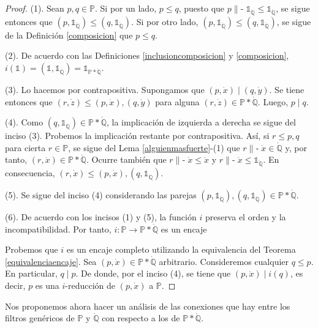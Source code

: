 \documentclass[11pt]{unam_tesis1}
\theoremstyle{MyThmStyle}
\theoremstyle{definition}
\theoremstyle{plain}
\theoremstyle{remark}
\def\forces{\mathop{\parallel\!\!\!-}\nolimits}
\let\Vdash\forces
\let\leq\leqslant
\begin{document}
\begin{proof}
(1). Sean $p,q\in \mathbb P$. Si por un lado, $p\leq q$, puesto que $p\Vdash \mathds{1}_{\dot{\mathbb Q}}\leq \mathds{1}_{\dot{\mathbb Q}}$, se sigue entonces que $(p,\mathds{1}_{\dot{\mathbb Q}})\leq (q,\mathds 1_{\dot{\mathbb Q}})$. Si por otro lado, $(p,\mathds 1_{\dot{\mathbb Q}})\leq (q,\mathds 1_{\dot{\mathbb Q}})$, se sigue de la Definici\'on \ref{composicion} que $p\leq q$.

(2). De acuerdo con las Definiciones \ref{inclusioncomposicion} y \ref{composicion}, $i(\mathds 1)=(\mathds 1,\mathds 1_{\dot{\mathbb Q}})=\mathds 1_{\mathbb P*\dot{\mathbb Q}}$.

(3). Lo hacemos por contrapositiva. Supongamos que $(p,\dot x)\mid (q,\dot y)$. Se tiene entonces que $(r,\dot z)\leq (p,\dot x),(q,\dot y)$ para alguna $(r,\dot z)\in \mathbb P*\dot{\mathbb Q}$. Luego, $p\mid q$.

(4). Como $(q,\mathds{1}_{\dot{\mathbb Q}})\in \mathbb P*\dot{\mathbb Q}$, la implicaci\'on de izquierda a derecha se sigue del inciso (3). Probemos la implicaci\'on restante por contrapositiva. As\'i, si $r\leq p,q$ para cierta $r\in \mathbb P$, se sigue del Lema \ref{alguienmasfuerte}-(1) que $r\Vdash \dot x\in \dot{\mathbb Q}$ y, por tanto, $(r,\dot x)\in \mathbb P*\dot{\mathbb Q}$. Ocurre tambi\'en que $r\Vdash \dot x\leq \dot x$ y $r\Vdash \dot x\leq \mathds 1_{\dot{\mathbb Q}}$. En consecuencia, $(r,\dot x)\leq (p,\dot x),(q,\mathds 1_{\dot{\mathbb Q}})$.

(5). Se sigue del inciso (4) considerando las parejas $(p,\mathds 1_{\dot{\mathbb Q}}), (q,\mathds 1_{\dot{\mathbb Q}})\in \mathbb P*\dot{\mathbb Q}$.

(6). De acuerdo con los incisos (1) y (5), la funci\'on $i$ preserva el orden y la incompatibilidad. Por tanto, $i:\mathbb P\to \mathbb P*\dot{\mathbb Q}$ es un encaje

Probemos que $i$ es un encaje completo utilizando la equivalencia del Teorema \ref{equivalenciaencaje}. Sea $(p,\dot x)\in \mathbb P*\dot{\mathbb Q}$ arbitrario. Consideremos cualquier $q\leq p$. En particular, $q\mid p$. De donde, por el inciso (4), se tiene que $(p,\dot x)\mid i(q)$, es decir, $p$ es una $i$-reducci\'on de $(p,\dot x)$ a $\mathbb P$.
\end{proof}

Nos proponemos ahora hacer un an\'alisis de las conexiones que hay entre los filtros gen\'ericos de $\mathbb P$ y $\dot{\mathbb Q}$ con respecto a los de $\mathbb P*\dot{\mathbb Q}$.
\end{document}
